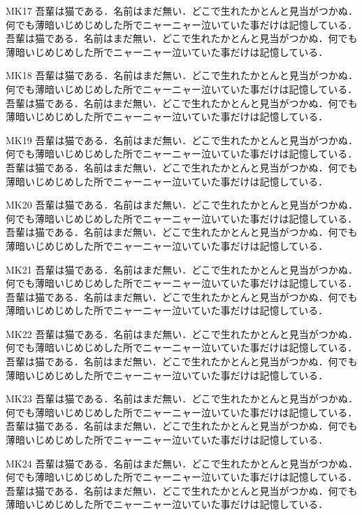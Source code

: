 \documentclass[fontsize=10pt,twocolumn]{jlreq}
\begin{document}
MK17 吾輩は猫である．名前はまだ無い．どこで生れたかとんと見当がつかぬ．何でも薄暗いじめじめした所でニャーニャー泣いていた事だけは記憶している． 吾輩は猫である．名前はまだ無い．どこで生れたかとんと見当がつかぬ．何でも薄暗いじめじめした所でニャーニャー泣いていた事だけは記憶している．\par
{}MK18 吾輩は猫である．名前はまだ無い．どこで生れたかとんと見当がつかぬ．何でも薄暗いじめじめした所でニャーニャー泣いていた事だけは記憶している． 吾輩は猫である．名前はまだ無い．どこで生れたかとんと見当がつかぬ．何でも薄暗いじめじめした所でニャーニャー泣いていた事だけは記憶している．\par
{}MK19 吾輩は猫である．名前はまだ無い．どこで生れたかとんと見当がつかぬ．何でも薄暗いじめじめした所でニャーニャー泣いていた事だけは記憶している． 吾輩は猫である．名前はまだ無い．どこで生れたかとんと見当がつかぬ．何でも薄暗いじめじめした所でニャーニャー泣いていた事だけは記憶している．\par
{}MK20 吾輩は猫である．名前はまだ無い．どこで生れたかとんと見当がつかぬ．何でも薄暗いじめじめした所でニャーニャー泣いていた事だけは記憶している． 吾輩は猫である．名前はまだ無い．どこで生れたかとんと見当がつかぬ．何でも薄暗いじめじめした所でニャーニャー泣いていた事だけは記憶している．\par
{}MK21 吾輩は猫である．名前はまだ無い．どこで生れたかとんと見当がつかぬ．何でも薄暗いじめじめした所でニャーニャー泣いていた事だけは記憶している． 吾輩は猫である．名前はまだ無い．どこで生れたかとんと見当がつかぬ．何でも薄暗いじめじめした所でニャーニャー泣いていた事だけは記憶している．\par
{}MK22 吾輩は猫である．名前はまだ無い．どこで生れたかとんと見当がつかぬ．何でも薄暗いじめじめした所でニャーニャー泣いていた事だけは記憶している． 吾輩は猫である．名前はまだ無い．どこで生れたかとんと見当がつかぬ．何でも薄暗いじめじめした所でニャーニャー泣いていた事だけは記憶している．\par
{}MK23 吾輩は猫である．名前はまだ無い．どこで生れたかとんと見当がつかぬ．何でも薄暗いじめじめした所でニャーニャー泣いていた事だけは記憶している． 吾輩は猫である．名前はまだ無い．どこで生れたかとんと見当がつかぬ．何でも薄暗いじめじめした所でニャーニャー泣いていた事だけは記憶している．\par
{}MK24 吾輩は猫である．名前はまだ無い．どこで生れたかとんと見当がつかぬ．何でも薄暗いじめじめした所でニャーニャー泣いていた事だけは記憶している． 吾輩は猫である．名前はまだ無い．どこで生れたかとんと見当がつかぬ．何でも薄暗いじめじめした所でニャーニャー泣いていた事だけは記憶している．\par
\end{document}
